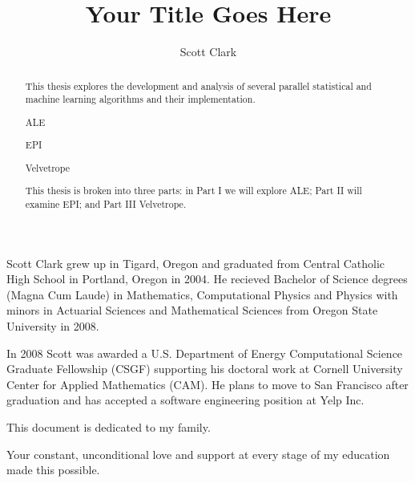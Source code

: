 \documentclass[phd,tocprelim]{cornell}
\title {Your Title Goes Here}
\author {Scott Clark}
\begin{document}
\maketitle
\makecopyright

\begin{abstract}
This thesis explores the development and analysis of several parallel statistical and machine learning algorithms and their implementation.

ALE

EPI

Velvetrope

This thesis is broken into three parts: in Part I we will explore ALE; Part II will examine EPI; and Part III Velvetrope.
\end{abstract}

\begin{biosketch}
Scott Clark grew up in Tigard, Oregon and graduated from Central Catholic High School in Portland, Oregon in 2004. He recieved Bachelor of Science degrees (Magna Cum Laude) in Mathematics, Computational Physics and Physics with minors in Actuarial Sciences and Mathematical Sciences from Oregon State University in 2008.

In 2008 Scott was awarded a U.S. Department of Energy Computational Science Graduate Fellowship (CSGF) supporting his doctoral work at Cornell University Center for Applied Mathematics (CAM). He plans to move to San Francisco after graduation and has accepted a software engineering position at Yelp Inc.
\end{biosketch}

\begin{dedication}
This document is dedicated to my family.

Your constant, unconditional love and support at every stage of my education made this possible.
\end{dedication}
\end{document}
